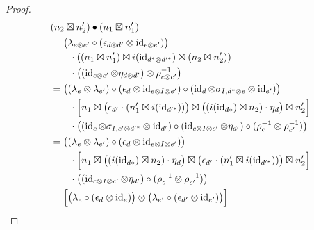 \documentclass[12pt,oneside,article,draft]{memoir}
\begin{document}
\begin{proof}

   \begin{align*}
      &(n_2\boxtimes n'_2)\bullet(n_1\boxtimes n'_1) \\
      &= \bigl(\lambda_{e\otimes e'}\circ(\epsilon_{d\otimes d'}\otimes\id_{e\otimes e'})\bigr) \\
      &\qquad \cdot\left((n_1\boxtimes n'_1)\boxtimes i(\id_{d^*\otimes d'^{*}})\boxtimes(n_2\boxtimes n'_2)\right) \\
      &\qquad \cdot\left((\id_{c\otimes c'}\otimes\eta_{d\otimes d'})\otimes\rho_{c\otimes c'}^{-1}\right)\\
      &= \bigl((\lambda_e\otimes\lambda_{e'})\circ(\epsilon_d\otimes\id_{e\otimes I\otimes e'})\circ(\id_d\otimes\sigma_{I,d^*\otimes e}\otimes\id_{e'})\bigr) \\
      &\qquad \cdot\Bigl[n_1\boxtimes\bigl(\epsilon_{d'}\cdot(n'_1\boxtimes i(\id_{d'^{*}}))\bigr)\boxtimes\bigl((i(\id_{d*})\boxtimes n_2)\cdot\eta_d\bigr)\boxtimes n'_2\Bigr] \\
      &\qquad \cdot\bigl((\id_c\otimes\sigma_{I,c'\otimes d'^*}\otimes\id_{d'})\circ(\id_{c\otimes I\otimes c'}\otimes\eta_{d'})\circ(\rho_c^{-1}\otimes\rho_{c'}^{-1})\bigr) \\
      &= \bigl((\lambda_e\otimes\lambda_{e'})\circ(\epsilon_d\otimes\id_{e\otimes I\otimes e'})\bigr) \\
      &\qquad \cdot\Bigl[n_1\boxtimes\bigl((i(\id_{d*})\boxtimes n_2)\cdot\eta_d\bigr)\boxtimes\bigl(\epsilon_{d'}\cdot(n'_1\boxtimes i(\id_{d'^{*}}))\bigr)\boxtimes n'_2\Bigr] \\
      &\qquad \cdot\bigl((\id_{c\otimes I\otimes c'}\otimes\eta_{d'})\circ(\rho_c^{-1}\otimes\rho_{c'}^{-1})\bigr) \\
      &= \Bigl[\bigl(\lambda_e\circ(\epsilon_d\otimes\id_e)\bigr)\otimes\bigl(\lambda_{e'}\circ(\epsilon_{d'}\otimes\id_{e'})\bigr)\Bigr] \\

\end{align*}
\end{proof}
\end{document}
